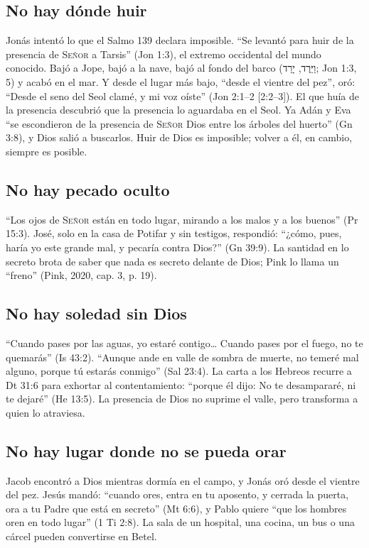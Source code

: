 \documentclass[11pt,letterpaper]{article}
\newcommand{\heb}[1]{\mbox{\foreignlanguage{hebrew}{#1}}}
\newcommand{\SENOR}{\textsc{Señor}}
\begin{document}
\subsection{No hay dónde huir}

Jonás intentó lo que el Salmo 139 declara imposible. ``Se levantó para huir de la presencia de \SENOR{} a Tarsis'' (Jon 1:3), el extremo occidental del mundo conocido. Bajó a Jope, bajó a la nave, bajó al fondo del barco (\heb{וַיֵּרֶד}, \heb{יָרַד}; Jon 1:3, 5) y acabó en el mar. Y desde el lugar más bajo, ``desde el vientre del pez'', oró: ``Desde el seno del Seol clamé, y mi voz oíste'' (Jon 2:1--2 [2:2--3]). El que huía de la presencia descubrió que la presencia lo aguardaba en el Seol. Ya Adán y Eva ``se escondieron de la presencia de \SENOR{} Dios entre los árboles del huerto'' (Gn 3:8), y Dios salió a buscarlos. Huir de Dios es imposible; volver a él, en cambio, siempre es posible.

\subsection{No hay pecado oculto}

``Los ojos de \SENOR{} están en todo lugar, mirando a los malos y a los buenos'' (Pr 15:3). José, solo en la casa de Potifar y sin testigos, respondió: ``¿cómo, pues, haría yo este grande mal, y pecaría contra Dios?'' (Gn 39:9). La santidad en lo secreto brota de saber que nada es secreto delante de Dios; Pink lo llama un ``freno'' (Pink, 2020, cap. 3, p. 19).

\subsection{No hay soledad sin Dios}

``Cuando pases por las aguas, yo estaré contigo\ldots{} Cuando pases por el fuego, no te quemarás'' (Is 43:2). ``Aunque ande en valle de sombra de muerte, no temeré mal alguno, porque tú estarás conmigo'' (Sal 23:4). La carta a los Hebreos recurre a Dt 31:6 para exhortar al contentamiento: ``porque él dijo: No te desampararé, ni te dejaré'' (He 13:5). La presencia de Dios no suprime el valle, pero transforma a quien lo atraviesa.

\subsection{No hay lugar donde no se pueda orar}

Jacob encontró a Dios mientras dormía en el campo, y Jonás oró desde el vientre del pez. Jesús mandó: ``cuando ores, entra en tu aposento, y cerrada la puerta, ora a tu Padre que está en secreto'' (Mt 6:6), y Pablo quiere ``que los hombres oren en todo lugar'' (1 Ti 2:8). La sala de un hospital, una cocina, un bus o una cárcel pueden convertirse en Betel.
\end{document}
